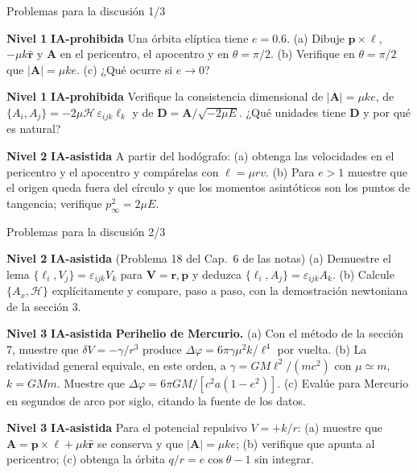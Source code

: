 \documentclass[aspectratio=169]{beamer}
\newcommand{\vr}{\mathbf r}
\newcommand{\vp}{\mathbf p}
\newcommand{\vA}{\mathbf A}
\newcommand{\vD}{\mathbf D}
\newcommand{\vl}{\boldsymbol\ell}
\newcommand{\rh}{\hat{\mathbf r}}
\newcommand{\PB}[2]{\{#1,#2\}}
\newcommand{\Hc}{\mathcal H}
\newcommand{\IAprohibida}{\colorbox{red!20}{\scriptsize\textbf{IA-prohibida}}}
\newcommand{\IAasistida}{\colorbox{yellow!30}{\scriptsize\textbf{IA-asistida}}}
\newcommand{\nivel}[1]{\colorbox{blue!12}{\scriptsize\textbf{Nivel #1}}}
\begin{document}
\begin{frame}{Problemas para la discusión 1/3}
\small
\begin{description}[P0]
  \item[P1] \nivel{1} \IAprohibida{}
        Una órbita elíptica tiene $e=0.6$. (a) Dibuje $\vp\times\vl$, $-\mu k\rh$ y $\vA$ en el
        pericentro, el apocentro y en $\theta=\pi/2$. (b) Verifique en $\theta=\pi/2$ que
        $|\vA|=\mu k e$. (c) ¿Qué ocurre si $e\to0$?
  \item[P2] \nivel{1} \IAprohibida{}
        Verifique la consistencia dimensional de $|\vA|=\mu k e$, de
        $\PB{A_i}{A_j}=-2\mu\Hc\,\varepsilon_{ijk}\ell_k$ y de $\vD=\vA/\sqrt{-2\mu E}$.
        ¿Qué unidades tiene $\vD$ y por qué es natural?
  \item[P3] \nivel{2} \IAasistida{}
        A partir del hodógrafo: (a) obtenga las velocidades en el pericentro y el apocentro y
        compárelas con $\ell=\mu r v$. (b) Para $e>1$ muestre que el origen queda fuera del
        círculo y que los momentos asintóticos son los puntos de tangencia; verifique
        $p_\infty^{2}=2\mu E$.
\end{description}
\end{frame}

\begin{frame}{Problemas para la discusión 2/3}
\small
\begin{description}[P0]
  \item[P4] \nivel{2} \IAasistida{} (Problema 18 del Cap.~6 de las notas)
        (a) Demuestre el lema $\PB{\ell_i}{V_j}=\varepsilon_{ijk}V_k$ para
        $\mathbf V=\vr,\vp$ y deduzca $\PB{\ell_i}{A_j}=\varepsilon_{ijk}A_k$.
        (b) Calcule $\PB{A_x}{\Hc}$ explícitamente y compare, paso a paso, con la demostración
        newtoniana de la sección 3.
  \item[P5] \nivel{3} \IAasistida{} \textbf{Perihelio de Mercurio.}
        (a) Con el método de la sección 7, muestre que $\delta V=-\gamma/r^{3}$ produce
        $\Delta\varphi=6\pi\gamma\mu^{2}k/\ell^{4}$ por vuelta.
        (b) La relatividad general equivale, en este orden, a $\gamma=GM\ell^{2}/(mc^{2})$
        con $\mu\simeq m$, $k=GMm$. Muestre que $\Delta\varphi=6\pi GM/[c^{2}a(1-e^{2})]$.
        (c) Evalúe para Mercurio en segundos de arco por siglo, citando la fuente de los datos.
  \item[P6] \nivel{3} \IAasistida{}
        Para el potencial repulsivo $V=+k/r$: (a) muestre que $\vA=\vp\times\vl+\mu k\rh$ se
        conserva y que $|\vA|=\mu k e$; (b) verifique que apunta al pericentro; (c) obtenga la
        órbita $q/r=e\cos\theta-1$ sin integrar.
\end{description}
\end{frame}
\end{document}
